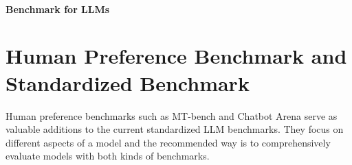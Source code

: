 \paragraph{Benchmark for LLMs}



\begin{table}[t]
\centering
\vspace{-1em}
\caption{Evaluation results of several model variants.}
\label{table:dataset_composition}
\scriptsize
{}
\vspace{-1.5em}
\end{table}


\section{Human Preference Benchmark and Standardized Benchmark}
\label{sec:training_data}
Human preference benchmarks such as MT-bench and Chatbot Arena serve as valuable additions to the current standardized LLM benchmarks. They focus on different aspects of a model and the recommended way is to comprehensively evaluate models with both kinds of benchmarks.

